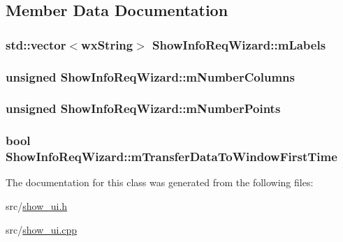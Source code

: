 \subsection{Member Data Documentation}
\hypertarget{a00139_a4b6e43640c2f5f15f3807813d6d35b91}{
\subsubsection[{m\-Labels}]{\setlength{\rightskip}{0pt plus 5cm}std\-::vector$<$wx\-String$>$ Show\-Info\-Req\-Wizard\-::m\-Labels\hspace{0.3cm}{\ttfamily [private]}}}\label{a00139_a4b6e43640c2f5f15f3807813d6d35b91}
\hypertarget{a00139_a97eee5905eebb815fc742e9b8835ba9d}{
\subsubsection[{m\-Number\-Columns}]{\setlength{\rightskip}{0pt plus 5cm}unsigned Show\-Info\-Req\-Wizard\-::m\-Number\-Columns\hspace{0.3cm}{\ttfamily [private]}}}\label{a00139_a97eee5905eebb815fc742e9b8835ba9d}
\hypertarget{a00139_a300e20de94b6e5977875d24198d495ef}{
\subsubsection[{m\-Number\-Points}]{\setlength{\rightskip}{0pt plus 5cm}unsigned Show\-Info\-Req\-Wizard\-::m\-Number\-Points\hspace{0.3cm}{\ttfamily [private]}}}\label{a00139_a300e20de94b6e5977875d24198d495ef}
\hypertarget{a00139_ab1f4e32591cbd94906d46779540ba905}{
\subsubsection[{m\-Transfer\-Data\-To\-Window\-First\-Time}]{\setlength{\rightskip}{0pt plus 5cm}bool Show\-Info\-Req\-Wizard\-::m\-Transfer\-Data\-To\-Window\-First\-Time\hspace{0.3cm}{\ttfamily [private]}}}\label{a00139_ab1f4e32591cbd94906d46779540ba905}


The documentation for this class was generated from the following files\-:\begin{DoxyCompactItemize}
\item 
src/\hyperlink{a00245}{show\-\_\-ui.\-h}\item 
src/\hyperlink{a00244}{show\-\_\-ui.\-cpp}\end{DoxyCompactItemize}
